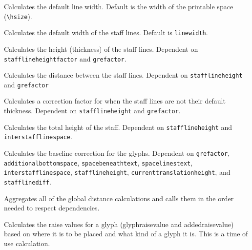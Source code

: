 Calculates the default line width.  Default is the width of the printable space (\verb=\hsize=).

Calculates the default width of the staff lines.  Default is \texttt{linewidth}.

Calculates the height (thickness) of the staff lines.  Dependent on \texttt{stafflineheightfactor} and \texttt{grefactor}.

Calculates the distance between the staff lines.  Dependent on \texttt{stafflineheight} and \texttt{grefactor}

Calculates a correction factor for when the staff lines are not their default thickness.  Dependent on \texttt{stafflineheight} and \texttt{grefactor}.

Calculates the total height of the staff.  Dependent on \texttt{stafflineheight} and \texttt{interstafflinespace}.

Calculates the baseline correction for the glyphs.  Dependent on \texttt{grefactor}, \texttt{additionalbottomspace}, \texttt{spacebeneathtext}, \texttt{spacelinestext}, \texttt{interstafflinespace}, \texttt{stafflineheight}, \texttt{currenttranslationheight}, and \texttt{stafflinediff}.

Aggregates all of the global distance calculations and calls them in the order needed to respect dependencies.

Calculates the raise values for a glyph (glyphraisevalue and addedraisevalue) based on where it is to be placed and what kind of a glyph it is.  This is a time of use calculation.


